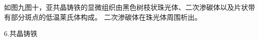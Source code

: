 \documentclass[a4paper,utf8]{article}
\begin{document}
如图九图十，亚共晶铸铁的显微组织由黑色树枝状珠光体、二次渗碳体以及片状带有部分斑点的低温莱氏体构成。
二次渗碳体在珠光体周围析出。
\begin{figure}[!ht]
    \begin{floatrow}
            
    \end{floatrow}

\end{figure}

6.共晶铸铁
\end{document}
